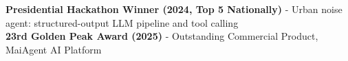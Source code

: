   \textbf{Presidential Hackathon Winner (2024, Top 5 Nationally)} - Urban noise agent: structured-output LLM pipeline and tool calling
  \\ \textbf{23rd Golden Peak Award (2025)} - Outstanding Commercial Product, MaiAgent AI Platform
